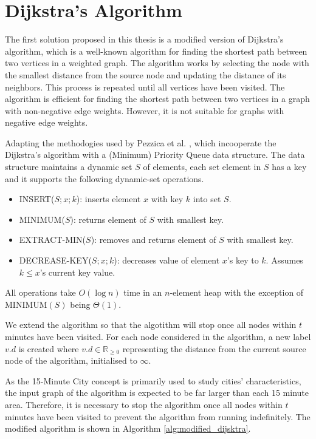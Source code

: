 \section{Dijkstra's Algorithm}

The first solution proposed in this thesis is a modified version of Dijkstra's algorithm, which is a well-known algorithm for finding the shortest path between two vertices in a weighted graph. The algorithm works by selecting the node with the smallest distance from the source node and updating the distance of its neighbors. This process is repeated until all vertices have been visited. The algorithm is efficient for finding the shortest path between two vertices in a graph with non-negative edge weights. However, it is not suitable for graphs with negative edge weights.

Adapting the methodogies used by Pezzica et al. \cite{cormen2022introduction}, which incooperate the Dijkstra's algorithm with a (Minimum) Priority Queue data structure. The data structure maintains a dynamic set $S$ of elements, each set element in $S$ has a key and it supports the following dynamic-set operations.

\begin{itemize}
    \item INSERT($S; x; k$): inserts element $x$ with key $k$ into set $S$.
    \item MINIMUM($S$): returns element of $S$ with smallest key.
    \item EXTRACT-MIN($S$): removes and returns element of $S$ with smallest key.
    \item DECREASE-KEY($S;x;k$): decreases value of element $x$'s key to $k$. Assumes $k\leq x$'s current key value.
\end{itemize}

All operations take $O(\log n)$ time in an $n$-element heap with the exception of $\text{MINIMUM}(S)$ being $\Theta(1)$.

We extend the algorithm so that the algotithm will stop once all nodes within $t$ minutes have been visited. For each node considered in the algorithm, a new label $v.d$ is created where $v.d \in \mathbb{R}_{\geq 0}$ representing the distance from the current source node of the algorithm, initialised to $\infty$.

As the 15-Minute City concept is primarily used to study cities' characteristics, the input graph of the algorithm is expected to be far larger than each 15 minute area. Therefore, it is necessary to stop the algorithm once all nodes within $t$ minutes have been visited to prevent the algorithm from running indefinitely. The modified algorithm is shown in Algorithm \ref{alg:modified_dijsktra}.


